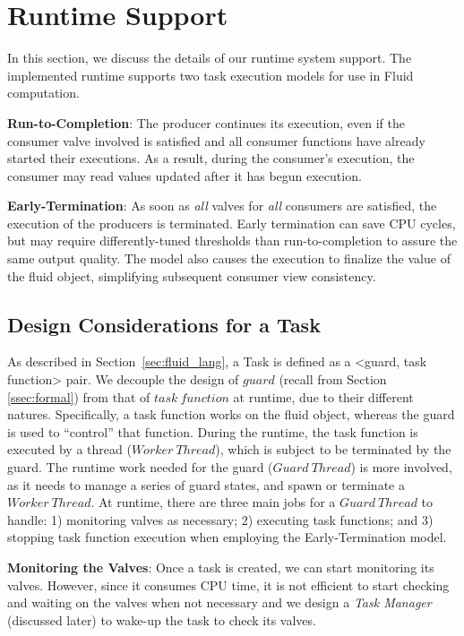 
\section{Runtime Support}
\label{sec:fluid_runtime}
\label{sec:exe-mode}
In this section, we discuss the details of our runtime system support. The implemented runtime supports two task execution models for use in Fluid computation.

\noindent\textbf{Run-to-Completion}: The producer continues its execution, even if the consumer valve involved is satisfied and all consumer functions have already started their executions. As a result, during the consumer's execution, the consumer may read values updated after it has begun execution. 

\noindent\textbf{Early-Termination}: As soon as \textit{all} valves for \textit{all} consumers are satisfied, the execution of the producers is terminated. Early termination can save CPU cycles, but may require differently-tuned thresholds than run-to-completion to assure the same output quality. The  model also causes the execution to finalize the value of the fluid object, simplifying subsequent consumer view consistency.

\subsection{Design Considerations for a Task}
As described in Section~\ref{sec:fluid_lang}, a Task is defined as a <guard, task function> pair. We decouple the design of $guard$ (recall from Section \ref{ssec:formal}) from that of $task\ function$ at runtime, due to their different natures. Specifically, a task function works on the fluid object, whereas the guard is used to ``control'' that function. During the runtime, the task function is executed by a thread ($Worker\ Thread$), which is subject to be terminated by the guard. The runtime work needed for the guard ($Guard\ Thread$) is more involved, as it needs to manage a series of guard states, and spawn or terminate a $Worker\ Thread$. At runtime, there are three main jobs for a $Guard\ Thread$ to handle: 1) monitoring valves as necessary; 2) executing task functions; and 3) stopping task function execution when employing the Early-Termination model. 


\noindent\textbf{Monitoring the Valves}: Once a task is created, we can start monitoring its valves. However, since it consumes CPU time, it is not efficient to start checking and waiting on the valves when not necessary and we design a \textit{Task Manager }(discussed later) to wake-up the task to check its valves.

